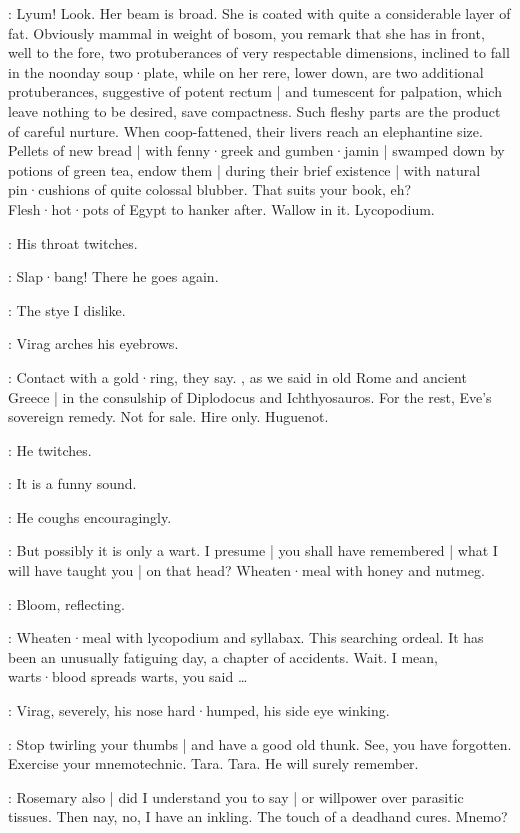 \Virag:
Lyum!
Look.
Her beam is broad.
She is coated with quite a considerable layer of fat.
Obviously mammal in weight of bosom,
you remark that she has in front,
well to the fore,
two protuberances of very respectable dimensions,
inclined to fall in the noonday soup·plate,
while on her rere,
lower down,
are two additional protuberances,
suggestive of potent rectum |
and tumescent for palpation,
which leave nothing to be desired,
save compactness.
Such fleshy parts are the product of careful nurture.
When coop-fattened,
their livers reach an elephantine size.
Pellets of new bread |
with fenny·greek and gumben·jamin |
swamped down by potions of green tea,
endow them |
during their brief existence |
with natural pin·cushions of quite colossal blubber.
That suits your book,
eh?
Flesh·hot·pots of Egypt to hanker after.
Wallow in it.
Lycopodium.

:
His throat twitches.

\Virag:
Slap·bang!
There he goes again.

\Bloom:
The stye I dislike.

:
Virag arches his eyebrows.

\Virag:
Contact with a gold·ring,
they say.
,
as we said in old Rome and ancient Greece |
in the consulship of Diplodocus and Ichthyosauros.
For the rest,
Eve's sovereign remedy.
Not for sale.
Hire only.
Huguenot.

:
He twitches.

\Virag:
It is a funny sound.

:
He coughs encouragingly.

\Virag:
But possibly it is only a wart.
I presume |
you shall have remembered |
what I will have taught you |
on that head?
Wheaten·meal with honey and nutmeg.

:
Bloom,
reflecting.

\Bloom:
Wheaten·meal with lycopodium and syllabax.
This searching ordeal.
It has been an unusually fatiguing day,
a chapter of accidents.
Wait.
I mean,
warts·blood spreads warts,
you said \ldots

:
Virag,
severely,
his nose hard·humped,
his side eye winking.

\Virag:
Stop twirling your thumbs |
and have a good old thunk.
See,
you have forgotten.
Exercise your mnemotechnic.
Tara.
Tara.
He will surely remember.

\Bloom:
Rosemary also |
did I understand you to say |
or willpower over parasitic tissues.
Then nay,
no,
I have an inkling.
The touch of a deadhand cures.
Mnemo?%

